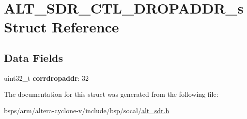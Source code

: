 \hypertarget{structALT__SDR__CTL__DROPADDR__s}{}\section{A\+L\+T\+\_\+\+S\+D\+R\+\_\+\+C\+T\+L\+\_\+\+D\+R\+O\+P\+A\+D\+D\+R\+\_\+s Struct Reference}
\label{structALT__SDR__CTL__DROPADDR__s}
\subsection*{Data Fields}
\begin{DoxyCompactItemize}
\item 
\mbox{\label{structALT__SDR__CTL__DROPADDR__s_a7a278097e019139c538d0446f2ec1ca3}} 
uint32\+\_\+t {\bfseries corrdropaddr}\+: 32
\end{DoxyCompactItemize}


The documentation for this struct was generated from the following file\+:\begin{DoxyCompactItemize}
\item 
bsps/arm/altera-\/cyclone-\/v/include/bsp/socal/\mbox{\hyperlink{alt__sdr_8h}{alt\+\_\+sdr.\+h}}\end{DoxyCompactItemize}
